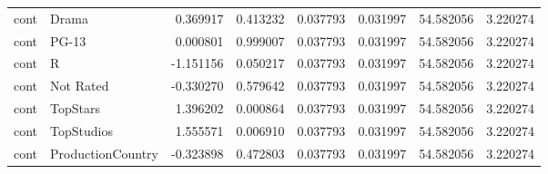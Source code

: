 \begin{tabular}{llrrrrrr}
cont & Drama & 0.369917 & 0.413232 & 0.037793 & 0.031997 & 54.582056 & 3.220274 \\
cont & PG-13 & 0.000801 & 0.999007 & 0.037793 & 0.031997 & 54.582056 & 3.220274 \\
cont & R & -1.151156 & 0.050217 & 0.037793 & 0.031997 & 54.582056 & 3.220274 \\
cont & Not Rated & -0.330270 & 0.579642 & 0.037793 & 0.031997 & 54.582056 & 3.220274 \\
cont & TopStars & 1.396202 & 0.000864 & 0.037793 & 0.031997 & 54.582056 & 3.220274 \\
cont & TopStudios & 1.555571 & 0.006910 & 0.037793 & 0.031997 & 54.582056 & 3.220274 \\
cont & ProductionCountry & -0.323898 & 0.472803 & 0.037793 & 0.031997 & 54.582056 & 3.220274 \\
\bottomrule
\end{tabular}
